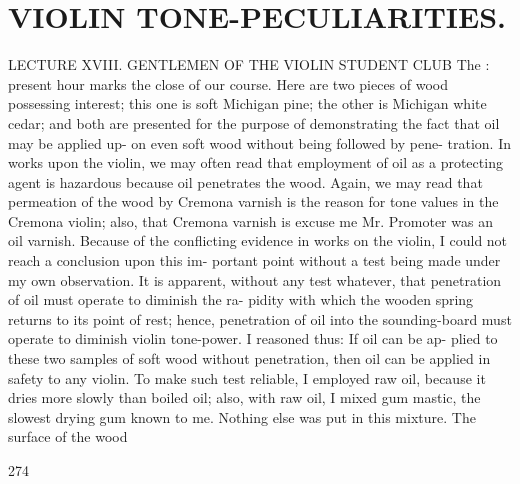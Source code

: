 \documentclass{article}
\begin{document}
\section*{VIOLIN TONE-PECULIARITIES.}
LECTURE XVIII. GENTLEMEN OF THE VIOLIN STUDENT CLUB The : present hour marks the close of our course. Here are two pieces of wood possessing interest; this one is soft Michigan pine; the other is Michigan white cedar; and both are presented for the purpose of demonstrating the fact that oil may be applied up- on even soft wood without being followed by pene- tration. In works upon the violin, we may often read that employment of oil as a protecting agent is hazardous because oil penetrates the wood. Again, we may read that permeation of the wood by Cremona varnish is the reason for tone values in the Cremona violin; also, that Cremona varnish is excuse me Mr. Promoter was an oil varnish. Because of the conflicting evidence in works on the violin, I could not reach a conclusion upon this im- portant point without a test being made under my own observation. It is apparent, without any test whatever, that penetration of oil must operate to diminish the ra- pidity with which the wooden spring returns to its point of rest; hence, penetration of oil into the sounding-board must operate to diminish violin tone-power. I reasoned thus: If oil can be ap- plied to these two samples of soft wood without penetration, then oil can be applied in safety to any violin. To make such test reliable, I employed raw oil, because it dries more slowly than boiled oil; also, with raw oil, I mixed gum mastic, the slowest drying gum known to me. Nothing else was put in this mixture. The surface of the wood

274
\end{document}
